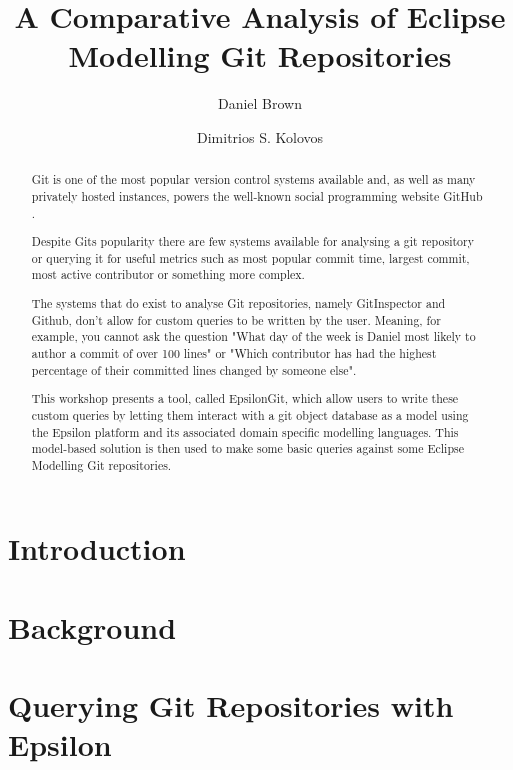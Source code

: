 \documentclass[runningheads,a4paper]{llncs}
\begin{document}
\title{A Comparative Analysis of Eclipse Modelling Git Repositories}
\author{Daniel Brown\and Dimitrios S. Kolovos}
\maketitle

\begin{abstract}
Git is one of the most popular version control systems available \cite{gitpopularity} and, as well as many privately hosted instances, powers the well-known social programming website GitHub \cite{gitpowersgithub}.

Despite Gits popularity there are few systems available for analysing a git repository or querying it for useful metrics such as most popular commit time, largest commit, most active contributor or something more complex.

The systems that do exist to analyse Git repositories, namely GitInspector \cite{gitinspector} and Github, don't allow for custom queries to be written by the user. Meaning, for example, you cannot ask the question "What day of the week is Daniel most likely to author a commit of over 100 lines" or "Which contributor has had the highest percentage of their committed lines changed by someone else". 

This workshop presents a tool, called EpsilonGit, which allow users to write these custom queries by letting them interact with a git object database as a model using the Epsilon platform and its associated domain specific modelling languages. This model-based solution is then used to make some basic queries against some Eclipse Modelling Git repositories.
\end{abstract}

\section{Introduction}


\section{Background}

\section{Querying Git Repositories with Epsilon}
\end{document}
